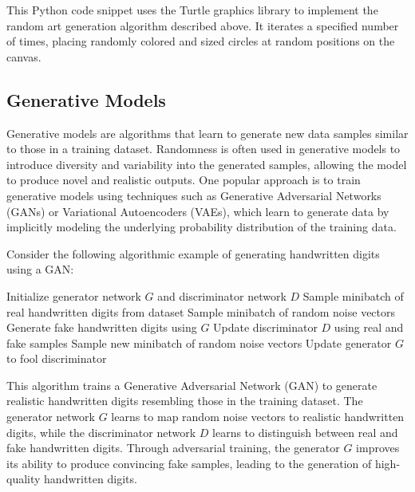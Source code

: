 \documentclass[12pt]{book} %
\begin{document}
This Python code snippet uses the Turtle graphics library to implement the random art generation algorithm described above. It iterates a specified number of times, placing randomly colored and sized circles at random positions on the canvas.

\subsection{Generative Models}

Generative models are algorithms that learn to generate new data samples similar to those in a training dataset. Randomness is often used in generative models to introduce diversity and variability into the generated samples, allowing the model to produce novel and realistic outputs. One popular approach is to train generative models using techniques such as Generative Adversarial Networks (GANs) or Variational Autoencoders (VAEs), which learn to generate data by implicitly modeling the underlying probability distribution of the training data.

Consider the following algorithmic example of generating handwritten digits using a GAN:
\FloatBarrier
\begin{algorithm}
\caption{Generative Adversarial Network for Handwritten Digit Generation}\label{alg:gan}
\begin{algorithmic}[1]
\State Initialize generator network $G$ and discriminator network $D$
 
    \State Sample minibatch of real handwritten digits from dataset
    \State Sample minibatch of random noise vectors
    \State Generate fake handwritten digits using $G$
    \State Update discriminator $D$ using real and fake samples
    \State Sample new minibatch of random noise vectors
    \State Update generator $G$ to fool discriminator
\EndFor
\EndProcedure
\end{algorithmic}
\end{algorithm}
\FloatBarrier
This algorithm trains a Generative Adversarial Network (GAN) to generate realistic handwritten digits resembling those in the training dataset. The generator network $G$ learns to map random noise vectors to realistic handwritten digits, while the discriminator network $D$ learns to distinguish between real and fake handwritten digits. Through adversarial training, the generator $G$ improves its ability to produce convincing fake samples, leading to the generation of high-quality handwritten digits.
\end{document}

